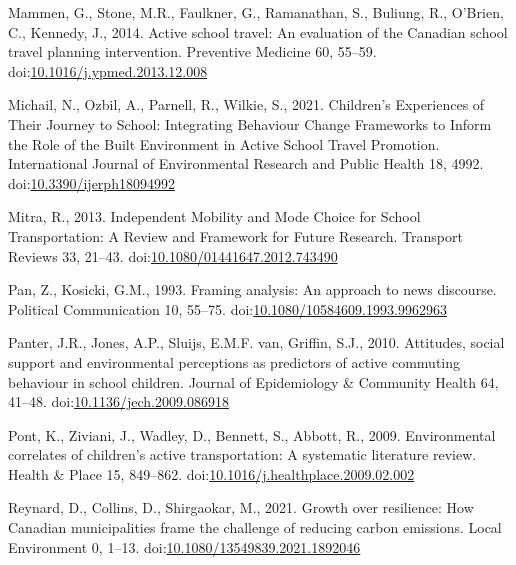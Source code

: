 \documentclass[]{elsarticle} %
\begin{document}
\leavevmode\hypertarget{ref-mammenActiveSchoolTravel2014}{}%
Mammen, G., Stone, M.R., Faulkner, G., Ramanathan, S., Buliung, R.,
O'Brien, C., Kennedy, J., 2014. Active school travel: An evaluation of
the Canadian school travel planning intervention. Preventive Medicine
60, 55--59.
doi:\href{https://doi.org/10.1016/j.ypmed.2013.12.008}{10.1016/j.ypmed.2013.12.008}

\leavevmode\hypertarget{ref-michailChildrenExperiencesTheir2021}{}%
Michail, N., Ozbil, A., Parnell, R., Wilkie, S., 2021. Children's
Experiences of Their Journey to School: Integrating Behaviour Change
Frameworks to Inform the Role of the Built Environment in Active School
Travel Promotion. International Journal of Environmental Research and
Public Health 18, 4992.
doi:\href{https://doi.org/10.3390/ijerph18094992}{10.3390/ijerph18094992}

\leavevmode\hypertarget{ref-mitraIndependentMobilityMode2013}{}%
Mitra, R., 2013. Independent Mobility and Mode Choice for School
Transportation: A Review and Framework for Future Research. Transport
Reviews 33, 21--43.
doi:\href{https://doi.org/10.1080/01441647.2012.743490}{10.1080/01441647.2012.743490}

\leavevmode\hypertarget{ref-panFramingAnalysisApproach1993}{}%
Pan, Z., Kosicki, G.M., 1993. Framing analysis: An approach to news
discourse. Political Communication 10, 55--75.
doi:\href{https://doi.org/10.1080/10584609.1993.9962963}{10.1080/10584609.1993.9962963}

\leavevmode\hypertarget{ref-panterAttitudesSocialSupport2010}{}%
Panter, J.R., Jones, A.P., Sluijs, E.M.F. van, Griffin, S.J., 2010.
Attitudes, social support and environmental perceptions as predictors of
active commuting behaviour in school children. Journal of Epidemiology
\& Community Health 64, 41--48.
doi:\href{https://doi.org/10.1136/jech.2009.086918}{10.1136/jech.2009.086918}

\leavevmode\hypertarget{ref-pontEnvironmentalCorrelatesChildren2009}{}%
Pont, K., Ziviani, J., Wadley, D., Bennett, S., Abbott, R., 2009.
Environmental correlates of children's active transportation: A
systematic literature review. Health \& Place 15, 849--862.
doi:\href{https://doi.org/10.1016/j.healthplace.2009.02.002}{10.1016/j.healthplace.2009.02.002}

\leavevmode\hypertarget{ref-reynardGrowthResilienceHow2021}{}%
Reynard, D., Collins, D., Shirgaokar, M., 2021. Growth over resilience:
How Canadian municipalities frame the challenge of reducing carbon
emissions. Local Environment 0, 1--13.
doi:\href{https://doi.org/10.1080/13549839.2021.1892046}{10.1080/13549839.2021.1892046}
\end{document}
